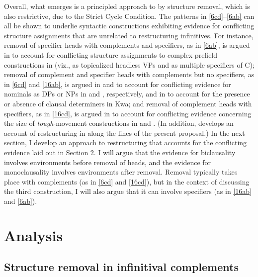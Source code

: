 \documentclass[output=paper]{langsci/langscibook}
\begin{document}
\noindent Overall, what emerges is a principled approach to  by
structure removal, which is also restrictive, due to the Strict Cycle
Condition. The patterns in \eqref{6cd}--\eqref{6ab} can all be shown to
underlie syntactic constructions exhibiting evidence for conflicting structure
assignments that are unrelated to restructuring infinitives. For instance,
removal of specifier heads with complements and specifiers, as in \eqref{6ab}, is
argued in \cite{Mueller:17:pre} to account for conflicting structure
assignments to  complex prefield constructions in  (viz., as topicalized
headless VPs  and as multiple specifiers of C); removal of complement and
specifier heads with complements but no specifiers, as in \eqref{6cd} and
\eqref{16ab}, is argued in \cite{Mueller:15:str} and \cite{Puskar:16} to account
for conflicting evidence for nominals as DPs or NPs in  and
, respectively, and in \cite{Korsah&Murphy:17:aga} to account for
the presence or absence of clausal determiners in Kwa; and removal of
complement heads with specifiers, as in \eqref{16cd}, is argued in
\cite{Schwarzer:16} to account for conflicting evidence concerning the size of
{\itshape tough}-movement constructions in  and . (In addition,
\citealt{Dschaak:17} develops an account of restructuring in  along the
lines of the present proposal.) In the next section, I develop an approach to
restructuring that accounts for the conflicting evidence laid out in Section 2.
I will argue that the evidence for biclausality involves environments before
removal of  heads, and the evidence for monoclausality involves environments
after removal. Removal typically takes place with complements (as in
\eqref{6cd} and \eqref{16cd}), but in the context of discussing the third
construction, I will also argue that it can involve specifiers (as in
\eqref{16ab} and \eqref{6ab}).

\section{Analysis}\label{sec:32.4}

\subsection{Structure removal in infinitival complements}
\end{document}
